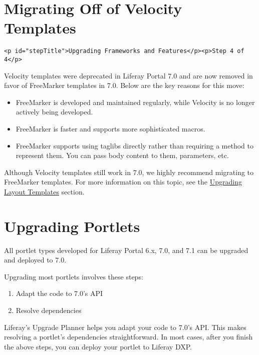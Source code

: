 \chapter{Migrating Off of Velocity
Templates}\label{migrating-off-of-velocity-templates}

\begin{verbatim}
<p id="stepTitle">Upgrading Frameworks and Features</p><p>Step 4 of 4</p>
\end{verbatim}

Velocity templates were deprecated in Liferay Portal 7.0 and are now
removed in favor of FreeMarker templates in 7.0. Below are the key
reasons for this move:

\begin{itemize}
\item
  FreeMarker is developed and maintained regularly, while Velocity is no
  longer actively being developed.
\item
  FreeMarker is faster and supports more sophisticated macros.
\item
  FreeMarker supports using taglibs directly rather than requiring a
  method to represent them. You can pass body content to them,
  parameters, etc.
\end{itemize}

Although Velocity templates still work in 7.0, we highly recommend
migrating to FreeMarker templates. For more information on this topic,
see the
\href{/docs/7-2/tutorials/-/knowledge_base/t/upgrading-a-layout-template-to-7-2}{Upgrading
Layout Templates} section.

\chapter{Upgrading Portlets}\label{upgrading-portlets}

All portlet types developed for Liferay Portal 6.x, 7.0, and 7.1 can be
upgraded and deployed to 7.0.

Upgrading most portlets involves these steps:

\begin{enumerate}
\def\labelenumi{\arabic{enumi}.}
\tightlist
\item
  Adapt the code to 7.0's API
\item
  Resolve dependencies
\end{enumerate}

Liferay's Upgrade Planner helps you adapt your code to 7.0's API. This
makes resolving a portlet's dependencies straightforward. In most cases,
after you finish the above steps, you can deploy your portlet to Liferay
DXP.


